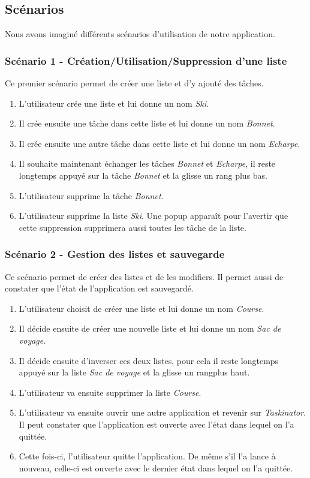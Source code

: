 \documentclass[a4paper,10pt]{article}
\begin{document}
\subsection{Scénarios}
Nous avons imaginé différents scénarios d'utilisation de notre application.
\subsubsection{Scénario 1 - Création/Utilisation/Suppression d'une liste}
Ce premier scénario permet de créer une liste et d'y ajouté des tâches.
\begin{enumerate}
\item{L'utilisateur crée une liste et lui donne un nom \textit{Ski}.}
\item{Il crée ensuite une tâche dans cette liste et lui donne un nom \textit{Bonnet}.}
\item{Il crée ensuite une autre tâche dans cette liste et lui donne un nom \textit{Echarpe}.}
\item{Il souhaite maintenant échanger les tâches \textit{Bonnet} et \textit{Echarpe}, il reste longtemps appuyé sur la tâche \textit{Bonnet} et la glisse un rang plus bas.} %
\item{L'utilisateur supprime la tâche \textit{Bonnet}.}
\item{L'utilisateur supprime la liste \textit{Ski}. Une popup apparaît pour l'avertir que cette suppression supprimera aussi toutes les tâche de la liste.}
\end{enumerate}

\subsubsection{Scénario 2 - Gestion des listes et sauvegarde}
Ce scénario permet de créer des listes et de les modifiers. Il permet aussi de constater que l'état de l'application est sauvegardé.
\begin{enumerate}
\item{L'utilisateur choisit de créer une liste et lui donne un nom \textit{Course}.}
\item{Il décide ensuite de créer une nouvelle liste et lui donne un nom \textit{Sac de voyage}.}
\item{Il décide ensuite d'inverser ces deux listes, pour cela il reste longtemps appuyé sur la liste \textit{Sac de voyage} et la glisse un rangplus haut.}
\item{L'utilisateur va ensuite supprimer la liste \textit{Course}.}
\item{L'utilisateur va ensuite ouvrir une autre application et revenir sur \textit{Taskinator}. Il peut constater que l'application est ouverte avec l'état dans lequel on l'a quittée.}
\item{Cette fois-ci, l'utilisateur quitte l'application. De même s'il l'a lance à nouveau, celle-ci est ouverte avec le dernier état dans lequel on l'a quittée.}
\end{enumerate}
\end{document}
